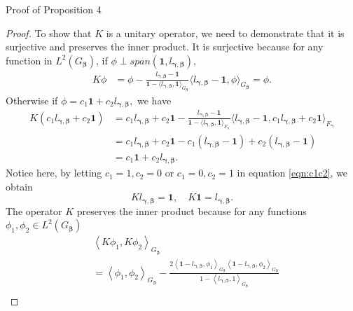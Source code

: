 \documentclass[11pt]{article}
\makeatletter
\newcommand\mysection{\@startsection {section}{1}{\z@}{-3.5ex \@plus -1ex \@minus -.2ex}{2.3ex \@plus.2ex}
{\normalfont\large\bfseries}}
\newcommand{\vect}[1]{\boldsymbol{#1}}
\newcommand{\inner}[1]{\left\langle #1 \right\rangle}
\makeatother
\begin{document}
\mysection{Proof of Proposition 4}  \label{App:unitary}
\begin{proof}
To show that $K$ is a unitary operator, we need to demonstrate that it is surjective and preserves the inner product. It is surjective because for any function in $L^{2}(G_{\vect{\beta}})$, if $\phi \perp span(\vect{1},l_{\vect{\gamma},\vect{\beta}})$,  
\begin{equation*}
\begin{aligned}
K\phi &= \phi-\frac{l_{\vect{\gamma},\vect{\beta}}-\vect{1}}{\vect{1}-\langle l_{\vect{\gamma},\vect{\beta}}, \vect{1}\rangle_{G_{\vect{\beta}}}}\langle l_{\vect{\gamma},\vect{\beta}}-\vect{1}, \phi \rangle_{G_{\vect{\beta}}} = \phi.
\end{aligned}
\end{equation*}
Otherwise if $\phi = c_1 \vect{1} + c_2 l_{\vect{\gamma},\vect{\beta}},$ we have 
\begin{equation}
\begin{aligned}
K(c_1 l_{\vect{\gamma},\vect{\beta}}+ c_2 \vect{1}) &= c_1 l_{\vect{\gamma},\vect{\beta}}+ c_2 \vect{1} - \frac{l_{\vect{\gamma},\vect{\beta}}-\vect{1}}{\vect{1}-\langle l_{\vect{\gamma},\vect{\beta}}, \vect{1}\rangle_{F_{\vect{\gamma}}}}\langle l_{\vect{\gamma},\vect{\beta}}-\vect{1}, c_1 l_{\vect{\gamma},\vect{\beta}}+ c_2 \vect{1} \rangle_{F_{\vect{\gamma}}} \\
&= c_1 l_{\vect{\gamma},\vect{\beta}}+ c_2 \vect{1} - c_1 (l_{\vect{\gamma},\vect{\beta}}-\vect{1}) +c_2 (l_{\vect{\gamma},\vect{\beta}}- \vect{1}) \\ 
&= c_1 \vect{1} + c_2 l_{\vect{\gamma},\vect{\beta}}.
\label{eqn:c1c2}
\end{aligned}
\end{equation}
Notice here, by letting $c_1=1, c_2=0$ or $c_1=0, c_2 = 1$ in equation \eqref{eqn:c1c2}, we obtain 
$$K l_{\vect{\gamma},\vect{\beta}} = \vect{1}, \quad K \vect{1} = l_{\vect{\gamma},\vect{\beta}}.$$
The operator $K$ preserves the inner product because for any functions $\phi_1, \phi_2 \in L^2(G_{\vect{\beta}})$ 
\begin{equation*}
\begin{aligned}
&\inner{K\phi_1,K\phi_2}_{G_{\vect{\beta}}} \\
&= \inner{\phi_1,\phi_2}_{G_{\vect{\beta}}} - \frac{2\inner{\vect{1}-l_{\vect{\gamma},\vect{\beta}},\phi_1}_{G_{\vect{\beta}}}\inner{\vect{1}-l_{\vect{\gamma},\vect{\beta}},\phi_2}_{G_{\vect{\beta}}}}{1-\inner{l_{\vect{\gamma},\vect{\beta}},1}_{G_{\vect{\beta}}}} \\

\end{aligned}
\end{equation*}
\end{proof}
\end{document}
